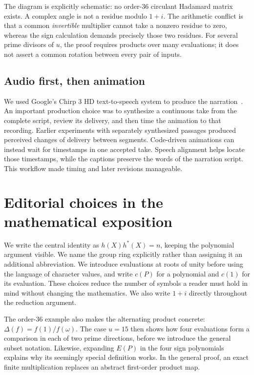 \documentclass[11pt]{article}
\begin{document}
The diagram is explicitly schematic: no order-36 circulant Hadamard matrix
exists. A complex angle is not a residue modulo $1+i$. The arithmetic
conflict is that a common \emph{invertible} multiplier cannot take a
nonzero residue to zero, whereas the sign calculation demands precisely
those two residues. For several prime divisors of $u$, the proof requires
products over many evaluations; it does not assert a common rotation
between every pair of inputs.

\subsection{Audio first, then animation}

We used Google's Chirp 3 HD text-to-speech system to produce the narration~\cite{google-chirp}. An important production choice was to synthesize a
continuous take from the complete script, review its delivery, and then
time the animation to that recording. Earlier experiments with separately
synthesized passages produced perceived changes of delivery between
segments. Code-driven animations can instead wait for timestamps in one
accepted take. Speech alignment helps locate those timestamps, while the
captions preserve the words of the narration script. This workflow made
timing and later revisions manageable.

\section{Editorial choices in the mathematical exposition}%
\label{sec:editorial}

We write the central identity as $h(X)h^{*}(X)=n$, keeping the polynomial
argument visible. We name the group ring explicitly rather than assigning
it an additional abbreviation. We introduce evaluations at roots of unity
before using the language of character values, and write $c(P)$ for a
polynomial and $c(1)$ for its evaluation. These choices reduce the number
of symbols a reader must hold in mind without changing the mathematics.
We also write $1+i$ directly throughout the reduction argument.

The order-36 example also makes the alternating product concrete:
$\Delta(f)=f(1)/f(\omega)$. The case $u=15$ then shows how four
evaluations form a comparison in each of two prime directions, before we
introduce the general subset notation. Likewise, expanding
$E(P)$ in the four sign polynomials explains why its seemingly special
definition works. In the general proof, an exact finite multiplication
replaces an abstract first-order product map.
\end{document}
